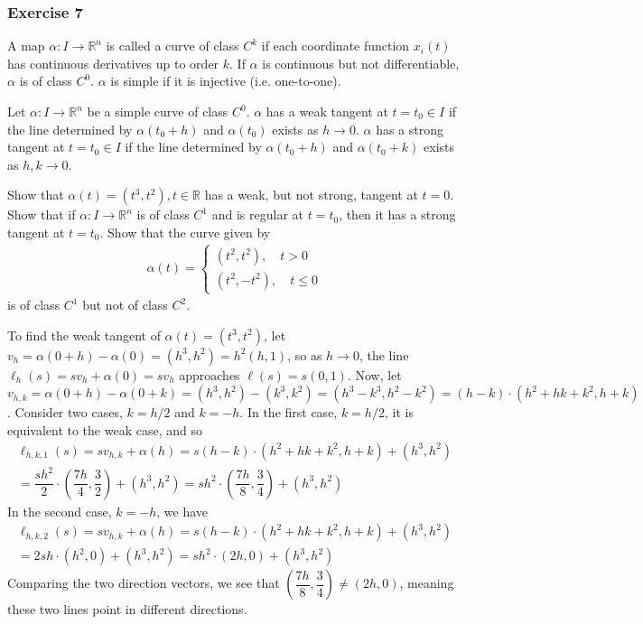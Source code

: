 \documentclass{article}
\newcommand{\R}{\mathbb{R}}
\begin{document}
	\subsubsection*{Exercise 7}
	A map $\alpha \colon I \to \R^n$ is called a curve of class $C^k$ if each coordinate function $x_i(t)$ has continuous derivatives up to order $k$. If $\alpha$ is continuous but not differentiable, $\alpha$ is of class $C^0$. $\alpha$ is simple if it is injective (i.e. one-to-one).
	
	Let $\alpha \colon I \to \R^n$ be a simple curve of class $C^0$. $\alpha$ has a weak tangent at $t = t_0 \in I$ if the line determined by $\alpha(t_0 + h)$ and $\alpha(t_0)$ exists as $h \to 0$. $\alpha$ has a strong tangent at $t = t_0 \in I$ if the line determined by $\alpha(t_0 + h)$ and $\alpha(t_0 + k)$ exists as $h, k \to 0$.
	
	Show that $\alpha(t) = (t^3, t^2), t \in \R$ has a weak, but not strong, tangent at $t = 0$. Show that if $\alpha \colon I \to \R^n$ is of class $C^1$ and is regular at $t = t_0$, then it has a strong tangent at $t = t_0$. Show that the curve given by
	\begin{gather*}
		\alpha(t) = \begin{cases}
			(t^2, t^2), \quad t > 0 \\
			(t^2, -t^2), \quad t \leq 0
		\end{cases}
	\end{gather*}
	is of class $C^1$ but not of class $C^2$.
	
	To find the weak tangent of $\alpha(t) = (t^3, t^2)$, let $v_h = \alpha(0 + h) - \alpha(0) = (h^3, h^2) = h^2(h, 1)$, so as $h \to 0$, the line $\ell_h(s) = sv_h + \alpha(0) = sv_h$ approaches $\ell(s) = s(0, 1)$. Now, let  $v_{h,k} = \alpha(0 + h) - \alpha(0 + k) = (h^3, h^2) - (k^3, k^2) = (h^3 - k^3, h^2 - k^2) = (h - k) \cdot (h^2 + hk + k^2, h + k)$. Consider two cases, $k = h/2$ and $k = -h$. In the first case, $k = h/2$, it is equivalent to the weak case, and so
	\begin{gather*}
		\ell_{h, k, 1}(s) = sv_{h,k} + \alpha(h) = s (h - k) \cdot (h^2 + hk + k^2, h + k) + (h^3, h^2) \\
		= \dfrac{sh^2}{2} \cdot \left( \dfrac{7h}{4}, \dfrac{3}{2} \right) + (h^3, h^2) = sh^2 \cdot \left( \dfrac{7h}{8}, \dfrac{3}{4} \right) + (h^3, h^2)
	\end{gather*}
	In the second case, $k = -h$, we have
	\begin{gather*}
		\ell_{h, k, 2}(s) = sv_{h,k} + \alpha(h) = s (h - k) \cdot (h^2 + hk + k^2, h + k) + (h^3, h^2) \\
		= 2sh \cdot (h^2, 0) + (h^3, h^2) = sh^2 \cdot (2h, 0) + (h^3, h^2)
	\end{gather*}
	Comparing the two direction vectors, we see that $\left( \dfrac{7h}{8}, \dfrac{3}{4} \right) \neq (2h, 0)$, meaning these two lines point in different directions.
	
\end{document}
